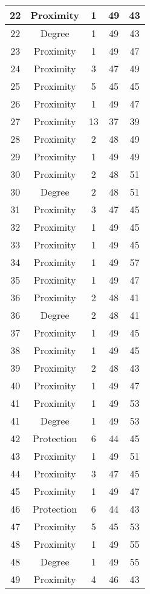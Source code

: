 \documentclass[results.tex]{subfiles}
\begin{document}
\begin{center}
\begin{tabular}{| c || c | c | c | c |}
    \hline
    22 & Proximity & 1 & 49 & 43 \\ 
    \hline
    22 & Degree & 1 & 49 & 43 \\ 
    \hline
    23 & Proximity & 1 & 49 & 47 \\ 
    \hline
    24 & Proximity & 3 & 47 & 49 \\ 
    \hline
    25 & Proximity & 5 & 45 & 45 \\ 
    \hline
    26 & Proximity & 1 & 49 & 47 \\ 
    \hline
    27 & Proximity & 13 & 37 & 39 \\ 
    \hline
    28 & Proximity & 2 & 48 & 49 \\ 
    \hline
    29 & Proximity & 1 & 49 & 49 \\ 
    \hline
    30 & Proximity & 2 & 48 & 51 \\ 
    \hline
    30 & Degree & 2 & 48 & 51 \\ 
    \hline
    31 & Proximity & 3 & 47 & 45 \\ 
    \hline
    32 & Proximity & 1 & 49 & 45 \\ 
    \hline
    33 & Proximity & 1 & 49 & 45 \\ 
    \hline
    34 & Proximity & 1 & 49 & 57 \\ 
    \hline
    35 & Proximity & 1 & 49 & 47 \\ 
    \hline
    36 & Proximity & 2 & 48 & 41 \\ 
    \hline
    36 & Degree & 2 & 48 & 41 \\ 
    \hline
    37 & Proximity & 1 & 49 & 45 \\ 
    \hline
    38 & Proximity & 1 & 49 & 45 \\ 
    \hline
    39 & Proximity & 2 & 48 & 43 \\ 
    \hline
    40 & Proximity & 1 & 49 & 47 \\ 
    \hline
    41 & Proximity & 1 & 49 & 53 \\ 
    \hline
    41 & Degree & 1 & 49 & 53 \\ 
    \hline
    42 & Protection & 6 & 44 & 45 \\ 
    \hline
    43 & Proximity & 1 & 49 & 51 \\ 
    \hline
    44 & Proximity & 3 & 47 & 45 \\ 
    \hline
    45 & Proximity & 1 & 49 & 47 \\ 
    \hline
    46 & Protection & 6 & 44 & 43 \\ 
    \hline
    47 & Proximity & 5 & 45 & 53 \\ 
    \hline
    48 & Proximity & 1 & 49 & 55 \\ 
    \hline
    48 & Degree & 1 & 49 & 55 \\ 
    \hline
    49 & Proximity & 4 & 46 & 43 \\ 
    \hline   \end{tabular}
\end{center}
\end{document}
